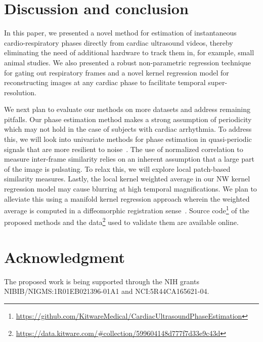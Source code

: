 \documentclass[journal]{IEEEtran}
\newcommand{\rk}[1]{{\color{blue}{#1}}}
\begin{document}
\vspace{-0.3cm}
\section{Discussion and conclusion}
\label{sec:conclusion}
%
In this paper, we presented a novel method for \rk{retrospective} estimation of instantaneous cardio-respiratory phases directly from cardiac ultrasound videos, thereby eliminating the need of additional hardware to track them in, for example, small animal studies. We also presented a robust non-parametric regression technique for gating out respiratory frames and a novel kernel regression model for reconstructing images at any cardiac phase to facilitate temporal super-resolution.

We next plan to evaluate our methods on more datasets and address remaining pitfalls. Our phase estimation method makes a strong assumption of periodicity which may not hold in the case of subjects with cardiac arrhythmia. To address this, we will look into univariate methods for phase estimation in quasi-periodic signals that are more resilient to noise~\cite{Luo2003,Lu2013,Kurz2015}. The use of normalized correlation to measure inter-frame similarity relies on an inherent assumption that a large part of the image is pulsating. To relax this, we will explore local patch-based similarity measures. Lastly, the local kernel weighted average in our NW kernel regression model may cause blurring at high temporal magnifications. We plan to alleviate this using a manifold kernel regression approach wherein the weighted average is computed in a diffeomorphic registration sense~\cite{Davis2010}. Source code\footnote{\url{https://github.com/KitwareMedical/CardiacUltrasoundPhaseEstimation}} of the proposed methods and the data\footnote{\url{https://data.kitware.com/\#collection/599604148d777f7d33e9c43d}} used to validate them are available online.
%
\vspace{-0.3cm}
\section*{Acknowledgment}
The proposed work is being supported through the NIH grants NIBIB/NIGMS:1R01EB021396-01A1 and NCI:5R44CA165621-04. 
%
\vspace{-0.3cm}


%
\end{document}
